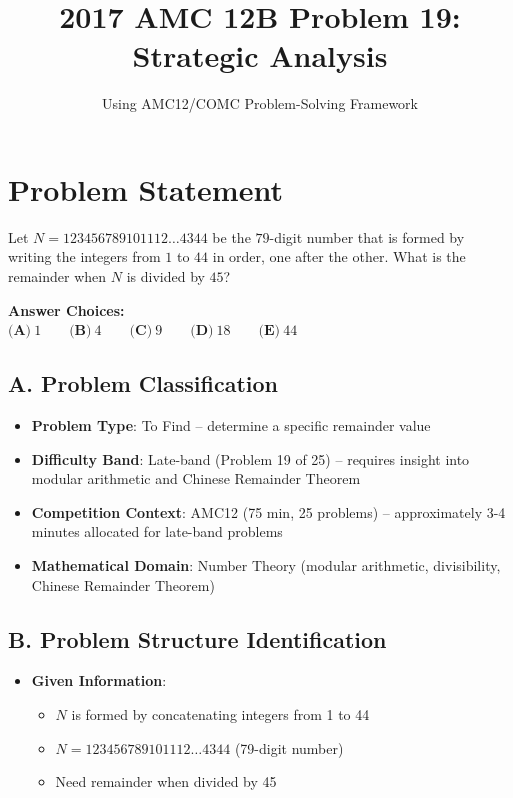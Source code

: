 \documentclass[11pt]{article}
\title{\textbf{2017 AMC 12B Problem 19: Strategic Analysis}}
\author{Using AMC12/COMC Problem-Solving Framework}
\date{}
\begin{document}
\maketitle

\section*{Problem Statement}
Let $N=123456789101112\dots4344$ be the $79$-digit number that is formed by writing the integers from $1$ to $44$ in order, one after the other. What is the remainder when $N$ is divided by $45$?

\textbf{Answer Choices:}\\
$\textbf{(A)}\ 1\qquad\textbf{(B)}\ 4\qquad\textbf{(C)}\ 9\qquad\textbf{(D)}\ 18\qquad\textbf{(E)}\ 44$

\begin{problemconfigbox}
\subsection*{A. Problem Classification}
\begin{itemize}[leftmargin=*]
    \item \textbf{Problem Type}: To Find -- determine a specific remainder value
    \item \textbf{Difficulty Band}: Late-band (Problem 19 of 25) -- requires insight into modular arithmetic and Chinese Remainder Theorem
    \item \textbf{Competition Context}: AMC12 (75 min, 25 problems) -- approximately 3-4 minutes allocated for late-band problems
    \item \textbf{Mathematical Domain}: Number Theory (modular arithmetic, divisibility, Chinese Remainder Theorem)
\end{itemize}

\subsection*{B. Problem Structure Identification}
\begin{itemize}[leftmargin=*]
    \item \textbf{Given Information}: 
    \begin{itemize}
        \item $N$ is formed by concatenating integers from 1 to 44
        \item $N = 123456789101112\dots4344$ (79-digit number)
        \item Need remainder when divided by 45
    \end{itemize}
    

\end{itemize}
\end{problemconfigbox}
\end{document}
